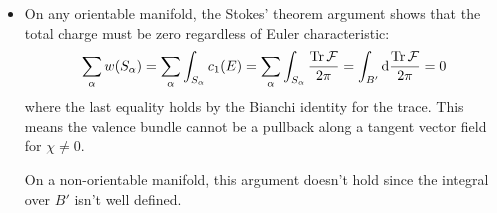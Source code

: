 {\begin{itemize}
	\item On any orientable manifold, the Stokes' theorem argument shows that the total charge must be zero regardless of Euler characteristic:
	\[
	\sum_{\alpha}w(S_\alpha) = \sum_{\alpha}\int_{S_\alpha} c_1(E) = \sum_{\alpha}\int_{S_\alpha}\frac{\Tr\mathcal{F}}{2\pi} = \int_{B'} \dd{\frac{\Tr\mathcal{F}}{2\pi}} = 0
	\]
	where the last equality holds by the Bianchi identity for the trace. This means the valence bundle cannot be a pullback along a tangent vector field for $\chi\neq0$.
	
	On a non-orientable manifold, this argument doesn't hold since the integral over $B'$ isn't well defined.
\end{itemize}
}  %
